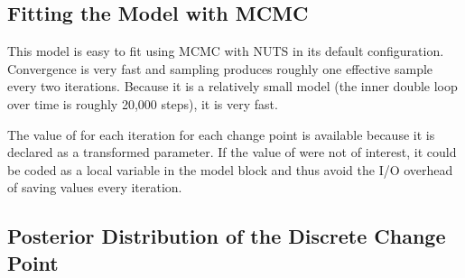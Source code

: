 \subsection{Fitting the Model with MCMC}

This model is easy to fit using MCMC with NUTS in its default
configuration.  Convergence is very fast and sampling produces roughly
one effective sample every two iterations.  Because it is a relatively
small model (the inner double loop over time is roughly 20,000 steps),
it is very fast.

The value of  for each iteration for each change point is
available because it is declared as a transformed parameter.  If the
value of  were not of interest, it could be coded as a local
variable in the model block and thus avoid the I/O overhead of saving
values every iteration.

\subsection{Posterior Distribution of the Discrete Change Point}

